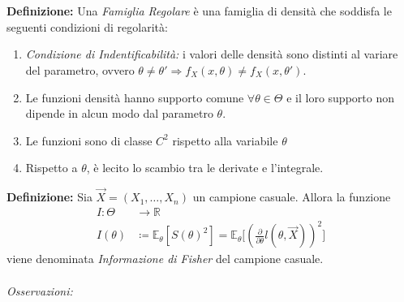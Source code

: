 \\
\\
\textbf{Definizione:} Una \textit{Famiglia Regolare} è una famiglia di densità che soddisfa le seguenti condizioni di regolarità:
\begin{enumerate}[noitemsep]
\item \textit{Condizione di Indentificabilità:} i valori delle densità sono distinti al variare del parametro, ovvero $\theta\neq \theta' \Longrightarrow f_X(x,\theta)\neq f_X(x,\theta')$.
\item Le funzioni densità hanno supporto comune $\forall \theta\in\Theta$ e il loro supporto non dipende in alcun modo dal parametro $\theta$.
\item Le funzioni sono di classe $C^2$ rispetto alla variabile $\theta$
\item Rispetto a $\theta$, è lecito lo scambio tra le derivate e l'integrale.
\end{enumerate}
\textbf{Definizione:} Sia $\vec{X}=(X_1,\ldots, X_n)$ un campione casuale. Allora la funzione
\begin{align*}
I:\Theta &\longrightarrow  \mathbb{R} \\
I(\theta)  &\coloneqq   \mathbb{E}_\theta[S(\theta)^2]=\mathbb{E}_\theta\Bigg[\left(\frac{\partial}{\partial \theta}l(\theta,\vec{X})\right)^2\Bigg]
\end{align*}
viene denominata \textit{Informazione di Fisher} del campione casuale.
\\
\\
\textit{Osservazioni:}
